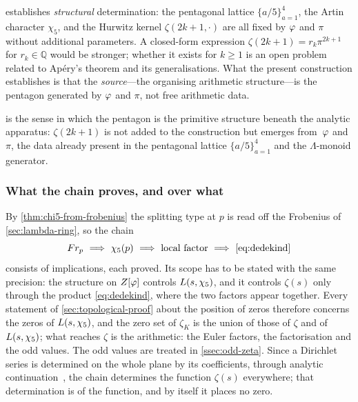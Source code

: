 \begin{remark}
\label{rmk:structural-vs-closed}
 establishes \emph{structural} determination:
the pentagonal lattice $\{a/5\}_{a=1}^{4}$, the Artin character
$\chi_5$, and the Hurwitz kernel $\zeta(2k+1,\cdot)$ are all fixed
by $\varphi$ and $\pi$ without additional parameters.  A closed-form
expression $\zeta(2k+1) = r_k\pi^{2k+1}$ for $r_k\in\mathbb{Q}$
would be stronger; whether it exists for $k\geq 1$ is an open
problem related to Ap\'ery's theorem and its generalisations.  What
the present construction establishes is that the \emph{source}---the
organising arithmetic structure---is the pentagon generated by
$\varphi$ and $\pi$, not free arithmetic data.
\end{remark}

\begin{remark}
\label{rmk:spectral-validation}
 is the sense in which the pentagon is the primitive structure
beneath the analytic apparatus: $\zeta(2k+1)$ is not added to the
construction but emerges from~$\varphi$ and~$\pi$, the data already
present in the pentagonal lattice $\{a/5\}_{a=1}^{4}$ and the
$\Lambda$-monoid generator.
\end{remark}








\subsubsection{What the chain proves, and over what}

By \cref{thm:chi5-from-frobenius} the splitting type at $p$ is read off the
Frobenius of \cref{sec:lambda-ring}, so the chain
\[
  \Frob_p\ \Longrightarrow\ \chiv(p)\ \Longrightarrow\ \text{local factor}\
  \Longrightarrow\ \eqref{eq:dedekind}
\]
consists of implications, each proved.  Its scope has to be stated with the same
precision: the structure on $Z[\varphi]$ controls $L(s,\chi_5)$, and it controls
$\zeta(s)$ only through the product \eqref{eq:dedekind}, where the two factors
appear together.  Every statement of \cref{sec:topological-proof} about the position of zeros therefore
concerns the zeros of $L(s,\chi_5)$, and the zero set of $\zeta_K$ is the union of those of $\zeta$ and of
$L(s,\chi_5)$; what reaches $\zeta$ is the arithmetic: the Euler factors, the factorisation and the odd values.
The odd values are treated in \cref{ssec:odd-zeta}.  Since a Dirichlet series is determined on the whole
plane by its coefficients, through analytic continuation\ \cite{riemann1859}, the chain determines the
function $\zeta(s)$ everywhere; that determination is of the function, and by itself it places no zero.


